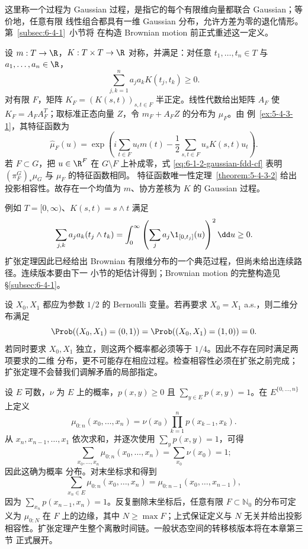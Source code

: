 \begin{example}\label{ex:6-1-2-2}
这里称一个过程为 Gaussian 过程，是指它的每个有限维向量都联合 Gaussian；等价地，任意有限
线性组合都具有一维 Gaussian 分布，允许方差为零的退化情形。第~\ref{subsec:6-4-1}~小节将
在构造 Brownian motion 前正式重述这一定义。

设 $m:T\to\R$，$K:T\times T\to\R$ 对称，并满足：对任意
$t_1,\ldots,t_n\in T$ 与 $a_1,\ldots,a_n\in\R$，
\[
 \sum_{j,k=1}^na_ja_kK(t_j,t_k)\ge0.
 \tag{6.1.6}\label{eq:6-1-2-positive-kernel}
\]
对有限 $F$，矩阵 $K_F=(K(s,t))_{s,t\in F}$ 半正定。线性代数给出矩阵 $A_F$ 使
$K_F=A_FA_F^T$；取标准正态向量 $Z$，令 $m_F+A_FZ$ 的分布为 $\mu_F$。由
例~\ref{ex:5-4-3-1}，其特征函数为
\[
 \widehat\mu_F(u)
 =\exp\!\left(i\sum_{t\in F}u_tm(t)
 -\frac12\sum_{s,t\in F}u_sK(s,t)u_t\right).
 \tag{6.1.7}\label{eq:6-1-2-gaussian-fdd-cf}
\]
若 $F\subset G$，把 $u\in\R^F$ 在 $G\setminus F$ 上补成零，式
\eqref{eq:6-1-2-gaussian-fdd-cf} 表明 $(\pi_F^G)_*\mu_G$ 与 $\mu_F$ 的特征函数相同。
特征函数唯一性定理~\ref{theorem:5-4-3-2} 给出投影相容性。故存在一个均值为 $m$、协方差核为
$K$ 的 Gaussian 过程。

例如 $T=[0,\infty)$、$K(s,t)=s\wedge t$ 满足
\[
 \sum_{j,k}a_ja_k(t_j\wedge t_k)
 =\int_0^\infty\left(\sum_ja_j\1_{[0,t_j]}(u)\right)^2\dd u\ge0.
\]
扩张定理因此已经给出 Brownian 有限维分布的一个典范过程，但尚未给出连续路径。连续版本要由下一
小节的矩估计得到；Brownian motion 的完整构造见 \S\ref{subsec:6-4-1}。
\end{example}

\begin{example}[互相冲突的二时刻要求]\label{ex:6-1-2-3}
设 $X_0,X_1$ 都应为参数 $1/2$ 的 Bernoulli 变量。若再要求 $X_0=X_1$ a.s.，则二维分布满足
\[
 \Prob((X_0,X_1)=(0,1))=\Prob((X_0,X_1)=(1,0))=0.
\]
若同时要求 $X_0,X_1$ 独立，则这两个概率都必须等于 $1/4$。因此不存在同时满足两项要求的二维
分布，更不可能存在相应过程。检查相容性必须在扩张之前完成；扩张定理不会替我们调解矛盾的局部指定。
\end{example}

\begin{example}\label{ex:6-1-2-markov-chain}
设 $E$ 可数，$\nu$ 为 $E$ 上的概率，$p(x,y)\ge0$ 且
$\sum_{y\in E}p(x,y)=1$。在 $E^{\{0,\ldots,n\}}$ 上定义
\[
\mu_{0:n}(x_0,\ldots,x_n)
=\nu(x_0)\prod_{k=1}^np(x_{k-1},x_k).
\tag{6.1.8}\label{eq:6-1-2-markov-fdd}
\]
从 $x_n,x_{n-1},\ldots,x_1$ 依次求和，并逐次使用
$\sum_y p(x,y)=1$，可得
\[
 \sum_{x_0,\ldots,x_n}\mu_{0:n}(x_0,\ldots,x_n)
 =\sum_{x_0}\nu(x_0)=1;
\]
因此这确为概率
分布。对末坐标求和得到
\[
 \sum_{x_n\in E}\mu_{0:n}(x_0,\ldots,x_n)
 =\mu_{0:n-1}(x_0,\ldots,x_{n-1}),
\]
因为 $\sum_{x_n}p(x_{n-1},x_n)=1$。反复删除末坐标后，任意有限
$F\subset\mathbb N_0$ 的分布可定义为 $\mu_{0:N}$ 在 $F$ 上的边缘，其中 $N\ge\max F$；上式保证定义与
$N$ 无关并给出投影相容性。扩张定理产生整个离散时间链。一般状态空间的转移核版本将在本章第三节
正式展开。
\end{example}

